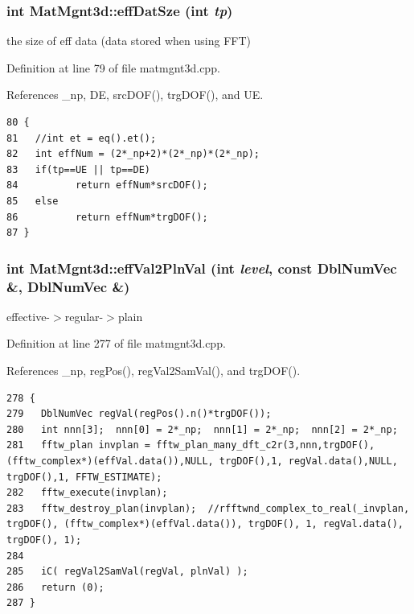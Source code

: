 \subsubsection{\setlength{\rightskip}{0pt plus 5cm}int Mat\-Mgnt3d::eff\-Dat\-Sze (int {\em tp})}\label{classMatMgnt3d_2ce9326034b7f6cfc6196785759829e1_2ce9326034b7f6cfc6196785759829e1}


the size of eff data (data stored when using FFT) 

Definition at line 79 of file matmgnt3d.cpp.

References \_\-np, DE, src\-DOF(), trg\-DOF(), and UE.

\footnotesize\begin{verbatim}80 {
81   //int et = eq().et();
82   int effNum = (2*_np+2)*(2*_np)*(2*_np);
83   if(tp==UE || tp==DE)
84          return effNum*srcDOF();
85   else
86          return effNum*trgDOF();
87 }
\end{verbatim}\normalsize 


\subsubsection{\setlength{\rightskip}{0pt plus 5cm}int Mat\-Mgnt3d::eff\-Val2Pln\-Val (int {\em level}, const Dbl\-Num\-Vec \&, Dbl\-Num\-Vec \&)}\label{classMatMgnt3d_17b8e15860d967b5e69c356d0b11a215_17b8e15860d967b5e69c356d0b11a215}


effective-$>$regular-$>$plain 



Definition at line 277 of file matmgnt3d.cpp.

References \_\-np, reg\-Pos(), reg\-Val2Sam\-Val(), and trg\-DOF().

\footnotesize\begin{verbatim}278 {
279   DblNumVec regVal(regPos().n()*trgDOF());
280   int nnn[3];  nnn[0] = 2*_np;  nnn[1] = 2*_np;  nnn[2] = 2*_np;
281   fftw_plan invplan = fftw_plan_many_dft_c2r(3,nnn,trgDOF(), (fftw_complex*)(effVal.data()),NULL, trgDOF(),1, regVal.data(),NULL, trgDOF(),1, FFTW_ESTIMATE);
282   fftw_execute(invplan);
283   fftw_destroy_plan(invplan);  //rfftwnd_complex_to_real(_invplan, trgDOF(), (fftw_complex*)(effVal.data()), trgDOF(), 1, regVal.data(), trgDOF(), 1);
284   
285   iC( regVal2SamVal(regVal, plnVal) );
286   return (0);
287 }
\end{verbatim}\normalsize 


